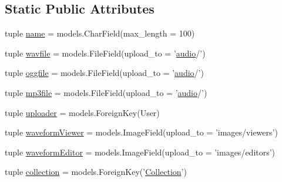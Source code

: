 \subsection*{Static Public Attributes}
\begin{DoxyCompactItemize}
\item 
tuple \hyperlink{classconcertapp_1_1models_1_1_audio_ae04794b3130a0944794079b152d88165}{name} = models.CharField(max\_\-length = 100)
\item 
tuple \hyperlink{classconcertapp_1_1models_1_1_audio_a402046ea2e37463b88cb6b1e6b319ed8}{wavfile} = models.FileField(upload\_\-to = '\hyperlink{classaudio}{audio}/')
\item 
tuple \hyperlink{classconcertapp_1_1models_1_1_audio_a08c46fd6f0a0d956f3620ec27068abb6}{oggfile} = models.FileField(upload\_\-to = '\hyperlink{classaudio}{audio}/')
\item 
tuple \hyperlink{classconcertapp_1_1models_1_1_audio_a418f35ae417360b2741b409fe503e8e9}{mp3file} = models.FileField(upload\_\-to = '\hyperlink{classaudio}{audio}/')
\item 
tuple \hyperlink{classconcertapp_1_1models_1_1_audio_ad9ba69e1d9ae2280808549f9514adf11}{uploader} = models.ForeignKey(User)
\item 
tuple \hyperlink{classconcertapp_1_1models_1_1_audio_ac995ddbe6cd395693f576fac68bb7336}{waveformViewer} = models.ImageField(upload\_\-to = 'images/viewers')
\item 
tuple \hyperlink{classconcertapp_1_1models_1_1_audio_a43056beb1e66b9a784a14abbebb663a2}{waveformEditor} = models.ImageField(upload\_\-to = 'images/editors')
\item 
tuple \hyperlink{classconcertapp_1_1models_1_1_audio_a56b2cb33d1f17e8fecbd4c6a2167a9df}{collection} = models.ForeignKey('\hyperlink{classconcertapp_1_1models_1_1_collection}{Collection}')
\end{DoxyCompactItemize}


